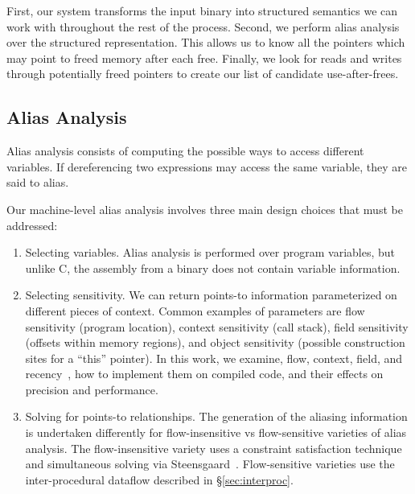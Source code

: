 \label{alias:sec:system}
First, our system transforms the input binary into structured
semantics we can work with throughout the rest of the process.
Second, we perform alias analysis over the structured representation.
This allows us to know all the pointers which may point to freed
memory after each free.  Finally, we look for reads and writes through
potentially freed pointers to create our list of candidate
use-after-frees.

\subsection{Alias Analysis}
Alias analysis consists of computing the possible ways to access different variables.
If dereferencing two expressions may access the same variable, they are said to alias.

Our machine-level alias analysis involves three main design choices that must be addressed:
\begin{enumerate}
\item Selecting variables.
  Alias analysis is performed over program variables, but unlike C, the assembly from a binary does not contain variable information.
\item Selecting sensitivity.
  We can return points-to information parameterized on different pieces of context.
  Common examples of parameters are flow sensitivity (program location), context sensitivity (call stack), field sensitivity (offsets within memory regions), and object sensitivity (possible construction sites for a ``this'' pointer).
  In this work, we examine, flow, context, field, and recency~\cite{vsa}, how to implement them on compiled code, and their effects on precision and performance.
\item Solving for points-to relationships.
  The generation of the aliasing information is undertaken differently for flow-insensitive vs flow-sensitive varieties of alias analysis.
  The flow-insensitive variety uses a constraint satisfaction technique and simultaneous solving via Steensgaard~\cite{steensgaard-alias}.
  Flow-sensitive varieties use the inter-procedural dataflow described in \S \ref{sec:interproc}.
\end{enumerate}

